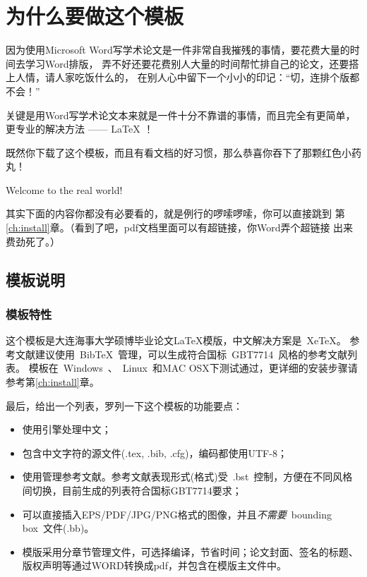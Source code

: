 \chapter{为什么要做这个模板}\label{ch:intr}


因为使用Microsoft 
Word写学术论文是一件非常自我摧残的事情，要花费大量的时间去学习Word排版，
弄不好还要花费别人大量的时间帮忙排自己的论文，还要搭上人情，请人家吃饭什么的，
在别人心中留下一个小小的印记：“切，连排个版都不会！”

{\xiaoerhao 关键是用Word写学术论文本来就是一件十分{\color{red}不}靠谱的事情，而且完全有更简单，更专业的解决方法 —— {\color{blue}\LaTeX} ！}

既然你下载了这个模板，而且有看文档的好习惯，那么恭喜你吞下了那颗红色小药丸！

Welcome to the real world!

其实下面的内容你都没有必要看的，就是例行的啰嗦啰嗦，你可以直接跳到
第\ref{ch:install}章。（看到了吧，pdf文档里面可以有超链接，你Word弄个超链接
出来费劲死了。）

\section{模板说明}
\label{sec:fastguide}

\subsection{模板特性}
\label{sec:features}

这个模板是大连海事大学硕博毕业论文\LaTeX{}模版，中文解决方案是~Xe\TeX{}。
参考文献建议使用~BibTeX~管理，可以生成符合国标~GBT7714~风格的参考文献列表。
模板在~Windows~、~Linux~和MAC OSX下测试通过，更详细的安装步骤请参考第\ref{ch:install}章。


最后，给出一个列表，罗列一下这个模板的功能要点：

\begin{itemize}
\item 使用\XeTeX 引擎处理中文；
\item 包含中文字符的源文件(.tex, .bib, .cfg)，编码都使用UTF-8；
\item 使用\BibTeX 管理参考文献。参考文献表现形式(格式)受~.bst~控制，方便在不同风格间切换\cite{Schmidt,Schneider2010,Sha2003,Shan2010,Wang2010}，目前生成的列表符合国标GBT7714要求；
\item 可以直接插入EPS/PDF/JPG/PNG格式的图像，并且\emph{不需要}~bounding box~文件(.bb)。
\item 模版采用分章节管理文件，可选择编译，节省时间；论文封面、签名的标题、版权声明等通过WORD转换成pdf，并包含在模版主文件中。

\end{itemize}


